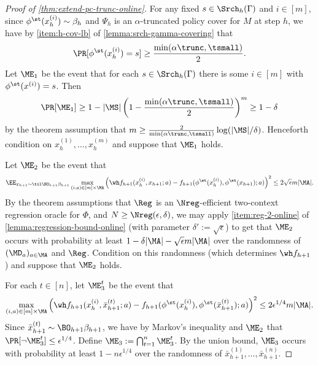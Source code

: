 \vspace{1em}

\begin{proof}[Proof of \cref{thm:extend-pc-trunc-online}]
For any fixed $s \in \Srch_h(\Gamma)$ and $i \in [m]$, since $\phi^\st(x_h^{(i)}) \sim \beta_h$ and $\Psi_h$ is an $\alpha$-truncated policy cover for $M$ at step $h$, we have by \cref{item:h-cov-lb} of \cref{lemma:srch-gamma-covering} that
\[\Pr[\phi^\st(x_h^{(i)}) = s] \geq \frac{\min(\alpha\trunc,\tsmall)}{2}.\]
Let $\ME_1$ be the event that for each $s \in \Srch_h(\Gamma)$ there is some $i \in [m]$ with $\phi^\st(x^{(i)}) = s$. Then
\[\Pr[\ME_1] \geq 1 - |\MS|\left(1 - \frac{\min(\alpha\trunc,\tsmall)}{2}\right)^m \geq 1-\delta\]
by the theorem assumption that $m \geq \frac{2}{\min(\alpha\trunc,\tsmall)} \log(|\MS|/\delta)$. Henceforth condition on $x_h^{(1)},\dots,x_h^{(m)}$ and suppose that $\ME_1$ holds.

Let $\ME_2$ be the event that
\[\EE_{x_{h+1}\sim\til\BO_{h+1}\beta_{h+1}} \max_{(i,a)\in [m]\times\MA} \left(\wh f_{h+1}(x_h^{(i)},x_{h+1};a) - f_{h+1}(\phi^\st(x_h^{(i)}),\phi^\st(x_{h+1});a)\right)^2 \leq 2\sqrt{\epsilon} m|\MA|.\]
By the theorem assumptions that $\Reg$ is an $\Nreg$-efficient two-context regression oracle for $\Phi$, and $N \geq \Nreg(\epsilon,\delta)$, we may apply \cref{item:reg-2-online} of \cref{lemma:regression-bound-online} (with parameter $\delta' := \sqrt{\epsilon}$) to get that $\ME_2$ occurs with probability at least $1-\delta|\MA| - \sqrt{\epsilon} m|\MA|$ over the randomness of $(\MD_a)_{a \in \MA}$ and $\Reg$. Condition on this randomness (which determines $\wh f_{h+1}$) and suppose that $\ME_2$ holds.

For each $t \in [n]$, let $\ME_3^t$ be the event that \[\max_{(i,a)\in[m]\times\MA} \left(\wh f_{h+1}(x_h^{(i)},\bar x_{h+1}^{(t)};a) - f_{h+1}(\phi^\st(x_h^{(i)}),\phi^\st(\bar x_{h+1}^{(t)}); a)\right)^2 \leq 2\epsilon^{1/4}m|\MA|.\] Since $\bar x_{h+1}^{(t)} \sim \BO_{h+1}\beta_{h+1}$, we have by Markov's inequality and $\ME_2$ that $\Pr[\lnot \ME_3^t] \leq \epsilon^{1/4}$. Define $\ME_3 := \bigcap_{t=1}^n \ME_3^t$. By the union bound, $\ME_3$ occurs with probability at least $1-n\epsilon^{1/4}$ over the randomness of $\bar x_{h+1}^{(1)},\dots,\bar x_{h+1}^{(n)}$. 


\end{proof}
